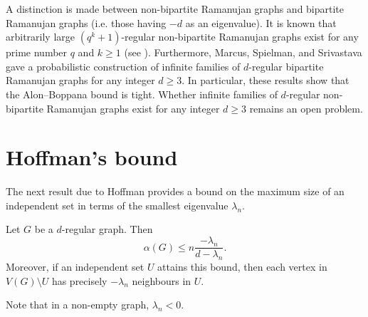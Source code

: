 A distinction is made between non-bipartite Ramanujan graphs and bipartite Ramanujan graphs (i.e. those having $-d$ as an eigenvalue).
It is known that arbitrarily large $(q^k + 1)$-regular non-bipartite Ramanujan graphs exist for any prime number $q$ and $k \ge 1$ (see \cite{morgensternramanujangraphs}).
Furthermore, Marcus, Spielman, and Srivastava \cite{interlacingfamilies} gave a probabilistic construction of infinite families of $d$-regular bipartite Ramanujan graphs for any integer $d \ge 3$.
In particular, these results show that the Alon--Boppana bound is tight.
Whether infinite families of $d$-regular non-bipartite Ramanujan graphs exist for any integer $d \ge 3$ remains an open problem.

\section{Hoffman's bound} \label{section:hoffman-bound}
The next result due to Hoffman provides a bound on the maximum size of an independent set in terms of the smallest eigenvalue $\lambda_n$.
\begin{theorem}
    Let $G$ be a $d$-regular graph. Then 
    \begin{equation*}
        \alpha(G) \le n \frac{-\lambda_n}{d - \lambda_n}.
    \end{equation*}
    Moreover, if an independent set $U$ attains this bound, then each vertex in $V(G) \setminus U$ has precisely $-\lambda_n$ neighbours in $U$. 
\end{theorem}

Note that in a non-empty graph, $\lambda_n < 0$.


